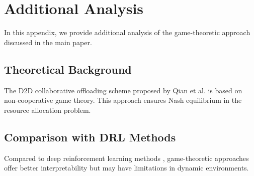 \documentclass{article}
\begin{document}
\section{Additional Analysis}

In this appendix, we provide additional analysis of the game-theoretic approach \cite{qian2022game} discussed in the main paper.

\subsection{Theoretical Background}

The D2D collaborative offloading scheme proposed by Qian et al. \cite{qian2022game} is based on non-cooperative game theory. This approach ensures Nash equilibrium in the resource allocation problem.

\subsection{Comparison with DRL Methods}

Compared to deep reinforcement learning methods \cite{he2017integrated}, game-theoretic approaches offer better interpretability but may have limitations in dynamic environments.
\end{document}
